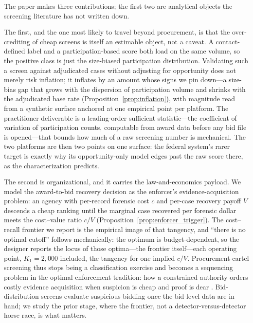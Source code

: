 The paper makes three contributions; the first two are analytical
objects the screening literature has not written down.

The first, and the one most likely to travel beyond procurement, is
that the over-crediting of cheap screens is itself an estimable object,
not a caveat. A contact-defined label and a participation-based score
both load on the same volume, so the positive class is just the
size-biased participation distribution. Validating such a screen
against adjudicated cases without adjusting for opportunity does not
merely risk inflation; it inflates by an amount whose signs we pin
down---a size-bias gap that grows with the dispersion of participation
volume and shrinks with the adjudicated base rate
(Proposition~\ref{prop:inflation}), with magnitude read from a synthetic
surface anchored at one empirical point per platform. The practitioner
deliverable is a leading-order sufficient statistic---the coefficient
of variation of participation counts, computable from award data before
any bid file is opened---that bounds how much of a raw screening number
is mechanical. The two platforms are then two points on one surface:
the federal system's rarer target is exactly why its opportunity-only
model edges past the raw score there, as the characterization predicts.

The second is organizational, and it carries the law-and-economics
payload. We model the award-to-bid recovery decision as the
enforcer's evidence-acquisition problem: an agency with per-record
forensic cost $c$ and per-case recovery payoff $V$ descends a cheap
ranking until the marginal case recovered per forensic dollar meets
the cost--value ratio $c/V$ (Proposition~\ref{prop:enforcer_trigger}).
The cost--recall frontier we report is the empirical image of that
tangency, and ``there is no optimal cutoff'' follows mechanically: the
optimum is budget-dependent, so the designer reports the locus of those
optima---the frontier itself---each operating point, $K_1=2{,}000$
included, the tangency for one implied $c/V$. Procurement-cartel
screening thus stops being a classification exercise and becomes a
sequencing problem in the optimal-enforcement tradition: how a
constrained authority orders costly evidence acquisition when suspicion
is cheap and proof is dear
\citep{becker1968crime,polinsky2000economic,townsend1979optimal,mookherjee1989optimal}.
Bid-distribution screens evaluate suspicious bidding once the
bid-level data are in hand; we study the prior stage, where the
frontier, not a detector-versus-detector horse race, is what matters.

